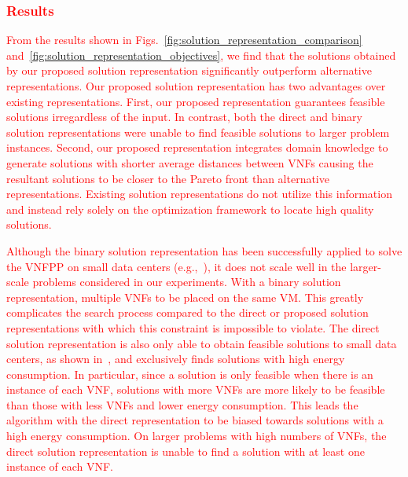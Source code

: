 \textcolor{red}{
\subsubsection{Results}
From the results shown in Figs.~\ref{fig:solution_representation_comparison} and~\ref{fig:solution_representation_objectives}, we find that the solutions obtained by our proposed solution representation significantly outperform alternative representations. Our proposed solution representation has two advantages over existing representations. First, our proposed representation guarantees feasible solutions irregardless of the input. In contrast, both the direct and binary solution representations were unable to find feasible solutions to larger problem instances. Second, our proposed representation integrates domain knowledge to generate solutions with shorter average distances between VNFs causing the resultant solutions to be closer to the Pareto front than alternative representations. Existing solution representations do not utilize this information and instead rely solely on the optimization framework to locate high quality solutions.
}
\textcolor{red}{
Although the binary solution representation has been successfully applied to solve the VNFPP on small data centers (e.g.,~\cite{ChantreF20,KaurGK020,CharismiadisTPM20}), it does not scale well in the larger-scale problems considered in our experiments. With a binary solution representation, multiple VNFs to be placed on the same VM. This greatly complicates the search process compared to the direct or proposed solution representations with which this constraint is impossible to violate.
}
\textcolor{red}{
The direct solution representation is also only able to obtain feasible solutions to small data centers, as shown in~, and exclusively finds solutions with high energy consumption. In particular, since a solution is only feasible when there is an instance of each VNF, solutions with more VNFs are more likely to be feasible than those with less VNFs and lower energy consumption. This leads the algorithm with the direct representation to be biased towards solutions with a high energy consumption. On larger problems with high numbers of VNFs, the direct solution representation is unable to find a solution with at least one instance of each VNF.
}

\vspace{0.5em}
\noindent
{}
    
